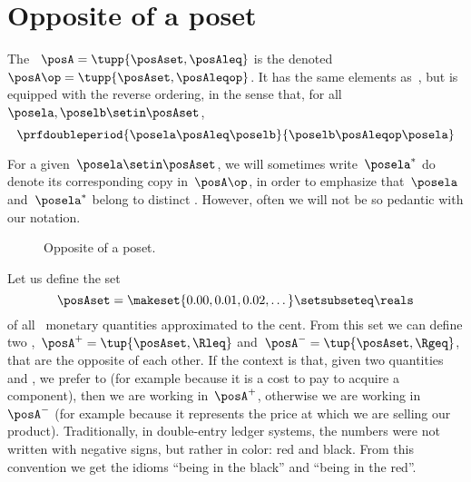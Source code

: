
\section{Opposite of a poset}\label{sec:opposite-of-a-poset}

\begin{definition}
    \label{def:poset-opposite}
    The ~$\posA=\tupp{\posAset, \posAleq}$ is the  denoted~$\posA\op=\tupp{\posAset, \posAleqop}$.
    It has the same elements as~\posA, but is equipped with the reverse ordering, in the sense that, for all~$\posela,\poselb \setin \posAset$,
    \begin{equation}\label{eq:poset-opposite}
        \prfdoubleperiod{
            \posela \posAleq \poselb
        }{
            \poselb \posAleqop \posela
        }
    \end{equation}
\end{definition}
For a given~$\posela \setin \posAset$, we will sometimes write~$\posela^*$ do denote its corresponding copy in~$\posA\op$, in order to emphasize that~$\posela$ and~$\posela^*$ belong to distinct .
However, often we will not be so pedantic with our notation.

\begin{figure}[tbh]
    \centering
    \caption{
        Opposite of a poset.
    }
    \label{fig:poset-opposite}
\end{figure}

\begin{example}
    Let us define the set
    \begin{equation}\label{eq:credit-debit}
        \posAset=\makeset{0.00,0.01,0.02,\dots}\setsubseteq\reals
    \end{equation}
    of all \CHFneutral \ monetary quantities approximated to the cent.
    From this set we can define two ,~$\posA^{+} = \tup{\posAset, \Rleq}$ and~$\posA^{-} = \tup{\posAset, \Rgeq}$, that are the opposite of each other.
    If the context is that, given two quantities \unit[1]{\CHFneutral} and \unit[2]{\CHFneutral}, we prefer \unit[1]{\CHFneutral} to \unit[2]{\CHFneutral} (for example because it is a cost to pay to acquire a component), then we are working in~$\posA^{+}$, otherwise we are working in~$\posA^{-}$ (for example because it represents the price at which we are selling our product).
    Traditionally, in double-entry ledger systems, the numbers were not written with negative signs, but rather in color: red and black.
    From this convention we get the idioms ``being in the black'' and ``being in the red''.
\end{example}
